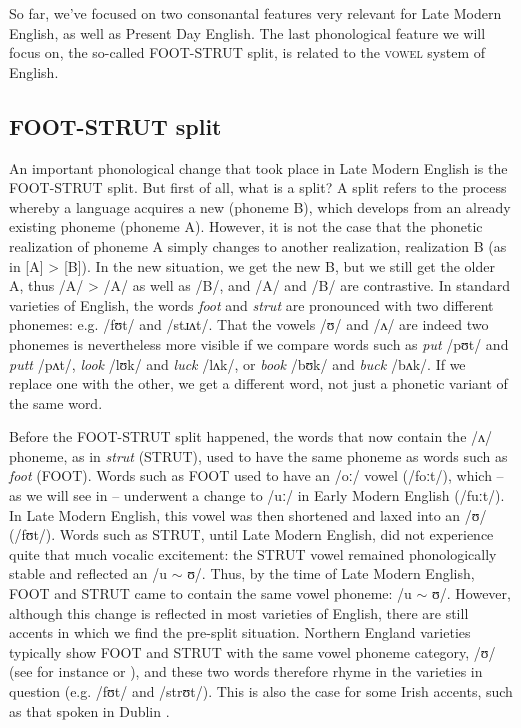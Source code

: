 \noindent So far, we've focused on two consonantal features very relevant for Late Modern English, as well as Present Day English. The last phonological feature we will focus on, the so-called FOOT-STRUT split, is related to the \textsc{vowel} system of English.

\subsection{FOOT-STRUT split}
An important phonological change that took place in Late Modern English is the FOOT-STRUT split. But first of all, what is a split? A split refers to the process whereby a language acquires a new  (phoneme B), which develops from an already existing phoneme (phoneme A). However, it is not the case that the phonetic realization of phoneme A simply changes to another realization, realization B (as in {[}A{]} > {[}B{]}). In the new situation, we get the new B, but we still get the older A, thus /A/ > /A/ as well as /B/, and /A/ and /B/ are contrastive. In standard varieties of English, the words \textit{foot} and \textit{strut} are pronounced with two different phonemes: e.g. /fʊt/ and /stɹʌt/. That the vowels /ʊ/ and /ʌ/ are indeed two phonemes is nevertheless more visible if we compare words such as \textit{put} /pʊt/ and \textit{putt} /pʌt/, \textit{look} /lʊk/ and \textit{luck} /lʌk/, or \textit{book} /bʊk/ and \textit{buck} /bʌk/. If we replace one with the other, we get a different word, not just a phonetic variant of the same word.

Before the FOOT-STRUT split happened, the words that now contain the /ʌ/ phoneme, as in \textit{strut} (STRUT), used to have the same phoneme as words such as \textit{foot} (FOOT). Words such as FOOT used to have an /oː/ vowel (/foːt/), which -- as we will see in  -- underwent a change to /uː/ in Early Modern English (/fuːt/). In Late Modern English, this vowel was then shortened and laxed into an /ʊ/ (/fʊt/). Words such as STRUT, until Late Modern English, did not experience quite that much vocalic excitement: the STRUT vowel remained phonologically stable and reflected an /u $\sim$ ʊ/. Thus, by the time of Late Modern English, FOOT and STRUT came to contain the same vowel phoneme: /u $\sim$ ʊ/. However, although this change is reflected in most varieties of English, there are still accents in which we find the pre-split situation. Northern England varieties typically show FOOT and STRUT with the same vowel phoneme category, /ʊ/ (see for instance \citealp{BaranowskiTurton2018} or \citealp{Strycharczuketal2019}), and these two words therefore rhyme in the varieties in question (e.g. /fʊt/ and /strʊt/). This is also the case for some Irish accents, such as that spoken in Dublin \citep[422]{Wells1982b}.



